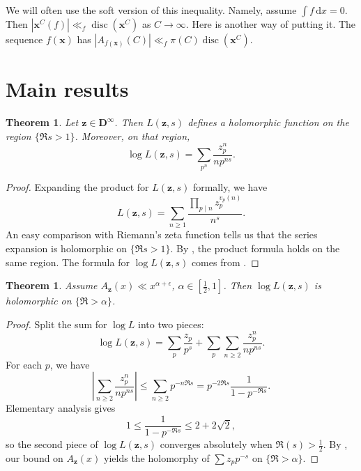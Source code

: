 \documentclass{article}
\DeclareMathOperator{\disc}{disc}
\newcommand{\bD}{\mathbf{D}}
\newcommand{\bx}{{\boldsymbol x}}
\newcommand{\bz}{{\boldsymbol z}}
\newcommand{\dd}{\mathrm{d}}
\newtheorem{theorem}[subsection]{Theorem}
\theoremstyle{definition}
\begin{document}
We will often use the soft version of this inequality. Namely, assume 
$\int f\, \dd x=0$. Then $|\bx^C(f)| \ll_f \disc(\bx^C)$ as $C\to \infty$. 
Here is another way of putting it. The sequence $f(\bx)$ has
$|A_{f(\bx)}(C)| \ll_f \pi(C) \disc(\bx^C)$. 





\section{Main results}\label{sec:prelim-result}

\begin{theorem}
Let $\bz\in \bD^\infty$. Then $L(\bz,s)$ defines a holomorphic 
function on the region $\{\Re s>1\}$. Moreover, on that region, 
\[
	\log L(\bz,s) = \sum_{p^n} \frac{z_p^n}{n p^{n s}} .
\]
\end{theorem}
\begin{proof}
Expanding the product for $L(\bz,s)$ formally, we have 
\[
	L(\bz,s) = \sum_{n\geqslant 1} \frac{\prod_{p\mid n} z_p^{v_p(n)}}{n^s} .
\]
An easy comparison with Riemann's zeta function tells us that the series 
expansion is holomorphic on $\{\Re s>1\}$. By \cite[Th.~11.7]{apostol-1976}, 
the product formula holds on the same region. The formula for 
$\log L(\bz,s)$ comes from \cite[11.9 Ex.2]{apostol-1976}.
\end{proof}

\begin{theorem}\label{thm:main-for-sequences}
Assume $A_\bz(x) \ll x^{\alpha +\epsilon}$, $\alpha\in [\frac 1 2,1]$. 
Then $\log L(\bz,s)$ is holomorphic on $\{\Re>\alpha\}$.
\end{theorem}
\begin{proof}
Split the sum for $\log L$ into two pieces:
\[
	\log L(\bz,s) = \sum_p \frac{z_p}{p^s} + \sum_p \sum_{n\geqslant 2} \frac{z_p^n}{n p^{n s}} .
\]
For each $p$, we have 
\[
	\left|\sum_{n\geqslant 2} \frac{z_p^n}{n p^{ns}} \right| \leqslant \sum_{n\geqslant 2} p^{-n \Re s} = p^{-2\Re s} \frac{1}{1-p^{-\Re s}} .
\]
Elementary analysis gives 
\[
	1 \leqslant \frac{1}{1-p^{-\Re s}} \leqslant 2+2\sqrt 2 ,
\]
so the second piece of $\log L(\bz,s)$ converges absolutely when 
$\Re(s)>\frac 1 2$. By \cite[II.1 Th.10]{tenenbaum-1995}, our bound on 
$A_\bz(x)$ yields the holomorphy of $\sum z_p p^{-s}$ on $\{\Re >\alpha\}$. 
\end{proof}
\end{document}
